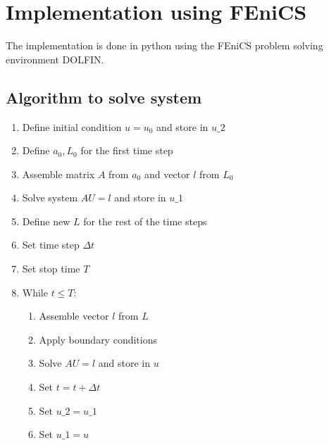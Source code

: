 \documentclass[twoside]{article}
\begin{document}
\section{Implementation using FEniCS}
The implementation is done in python using the FEniCS problem solving environment DOLFIN.
\subsection{Algorithm to solve system}
\begin{enumerate}
	\item Define initial condition \( u = u_0\) and store in \( u\_2\)
	\item Define \( a_0, L_0 \) for the first time step
	\item Assemble matrix \( A\) from \( a_0\) and vector \( l\) from \( L_0\)
	\item Solve system \(  AU=l\) and store in \( u\_1\)
	\item Define new \( L\) for the rest of the time steps
	\item Set time step \( \Delta t\)
	\item Set stop time \( T\)
	\item While \( t \leq T\):
	\begin{enumerate}
		\item Assemble vector \( l\) from \( L\)
		\item Apply boundary conditions
		\item Solve \( AU = l\) and store in \( u\)
		\item Set \( t = t + \Delta t\)
		\item Set \( u\_2 = u\_1\)
		\item Set \( u\_1 = u\)
	\end{enumerate}
\end{enumerate}
\end{document}
